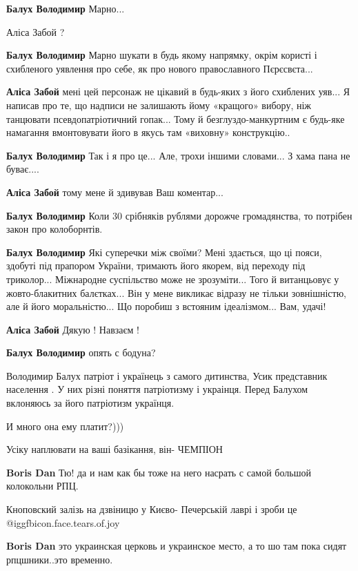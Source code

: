 \begin{itemize}
\begin{itemize}
\textbf{Балух Володимир} Марно...

Аліса Забой ?

\textbf{Балух Володимир} Марно шукати в будь якому напрямку, окрім користі і схибленого уявлення про себе, як про нового православного Пєрєсвєта...

\textbf{Аліса Забой} мені цей персонаж не цікавий в будь-яких з його схиблених уяв...
Я написав про те, що надписи не залишають йому «кращого» вибору, ніж танцювати псевдопатріотичний гопак...
Тому й безглуздо-манкуртним є будь-яке намагання вмонтовувати його в якусь там «виховну» конструкцію..

\textbf{Балух Володимир} Так і я про це... Але, трохи іншими словами... З хама пана не буває....

\textbf{Аліса Забой} тому мене й здивував Ваш коментар...

\textbf{Балух Володимир} Коли 30 срібняків рублями дорожче громадянства, то потрібен закон про колоборнтів.

\textbf{Балух Володимир} Які суперечки між своїми? Мені здається, що ці пояси, здобуті під прапором України, тримають його якорем, від переходу під триколор... Міжнародне суспільство може не зрозуміти... Того й витанцьовує у жовто-блакитних балєтках... Він у мене викликає відразу не тільки зовнішністю, але й його моральністю... Що поробиш з встояним ідеалізмом... Вам, удачі!

\textbf{Аліса Забой} Дякую ! Навзаєм !

\textbf{Балух Володимир} опять с бодуна?

Володимир Балух патріот і українець з самого дитинства, Усик представник населення . У них різні поняття патріотизму і украінця. Перед Балухом вклоняюсь за його патріотизм українця.

И много она ему платит?)))

Усіку наплювати на ваші базікання, він- ЧЕМПІОН

\textbf{Boris Dan} Тю! да и нам как бы тоже на него насрать с самой большой колокольни РПЦ.

Кноповский залізь на дзвіницю у Києво- Печерській лаврі і зроби це @igg{fbicon.face.tears.of.joy} 

\textbf{Boris Dan} это украинская церковь и украинское место, а то шо там пока сидят рпцшники..это временно.


\end{itemize}
\end{itemize}
